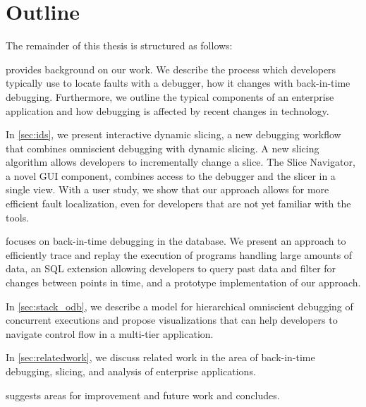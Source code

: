 \section{Outline}

The remainder of this thesis is structured as follows:

 provides background on our work.
We describe the process which developers typically use to locate faults with a debugger, how it changes with back-in-time debugging.
Furthermore, we outline the typical components of an enterprise application and how debugging is affected by recent changes in technology.

In \cref{sec:ids}, we present interactive dynamic slicing, a new debugging workflow that combines omniscient debugging with dynamic slicing.
A new slicing algorithm allows developers to incrementally change a slice. 
The Slice Navigator, a novel GUI component, combines access to the debugger and the slicer in a single view.
With a user study, we show that our approach allows for more efficient fault localization, even for developers that are not yet familiar with the tools.

 focuses on back-in-time debugging in the database.
We present an approach to efficiently trace and replay the execution of programs handling large amounts of data,
an SQL extension allowing developers to query past data and filter for changes between points in time,
and a prototype implementation of our approach.

In \cref{sec:stack_odb}, we describe a model for hierarchical omniscient debugging of concurrent executions and propose visualizations that can help developers to navigate control flow in a multi-tier application.

In \cref{sec:relatedwork}, we discuss related work in the area of back-in-time debugging, slicing, and analysis of enterprise applications.

 suggests areas for improvement and future work and concludes.


